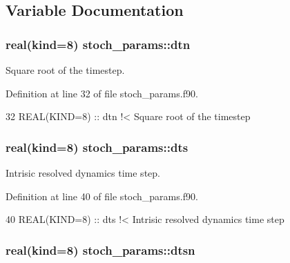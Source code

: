 \subsection{Variable Documentation}
\subsubsection[{\texorpdfstring{dtn}{dtn}}]{\setlength{\rightskip}{0pt plus 5cm}real(kind=8) stoch\+\_\+params\+::dtn}\hypertarget{namespacestoch__params_aae1255323ba779a9cefd5a979762b778}{}\label{namespacestoch__params_aae1255323ba779a9cefd5a979762b778}


Square root of the timestep. 



Definition at line 32 of file stoch\+\_\+params.\+f90.


\begin{DoxyCode}
32   \textcolor{keywordtype}{REAL(KIND=8)} :: dtn\textcolor{comment}{                !< Square root of the timestep}
\end{DoxyCode}
\subsubsection[{\texorpdfstring{dts}{dts}}]{\setlength{\rightskip}{0pt plus 5cm}real(kind=8) stoch\+\_\+params\+::dts}\hypertarget{namespacestoch__params_a760f666f9c629b98214821c8186f6ffc}{}\label{namespacestoch__params_a760f666f9c629b98214821c8186f6ffc}


Intrisic resolved dynamics time step. 



Definition at line 40 of file stoch\+\_\+params.\+f90.


\begin{DoxyCode}
40   \textcolor{keywordtype}{REAL(KIND=8)} :: dts\textcolor{comment}{                !< Intrisic resolved dynamics time step}
\end{DoxyCode}
\subsubsection[{\texorpdfstring{dtsn}{dtsn}}]{\setlength{\rightskip}{0pt plus 5cm}real(kind=8) stoch\+\_\+params\+::dtsn}\hypertarget{namespacestoch__params_a53aa511c9ceefb077d913bf728b3f516}{}\label{namespacestoch__params_a53aa511c9ceefb077d913bf728b3f516}


